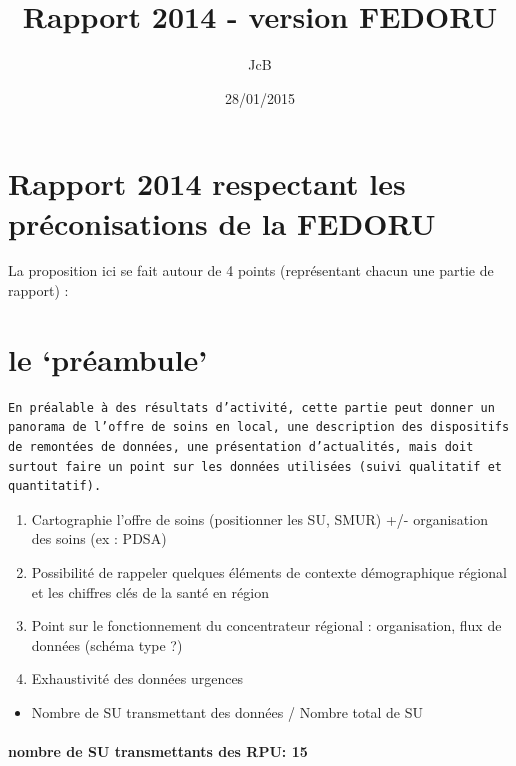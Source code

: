 \documentclass[]{article}
\title{Rapport 2014 - version FEDORU}
\author{JcB}
\date{28/01/2015}
\begin{document}
\maketitle


{
\hypersetup{linkcolor=black}
\setcounter{tocdepth}{2}
\tableofcontents
}
\section{Rapport 2014 respectant les préconisations de la
FEDORU}\label{rapport-2014-respectant-les-preconisations-de-la-fedoru}

La proposition ici se fait autour de 4 points (représentant chacun une
partie de rapport) :

\section{le `préambule'}\label{le-preambule}

\begin{verbatim}
En préalable à des résultats d’activité, cette partie peut donner un panorama de l’offre de soins en local, une description des dispositifs de remontées de données, une présentation d’actualités, mais doit surtout faire un point sur les données utilisées (suivi qualitatif et quantitatif).
\end{verbatim}

\begin{enumerate}
\def\labelenumi{\alph{enumi}.}
\item
  Cartographie l'offre de soins (positionner les SU, SMUR) +/-
  organisation des soins (ex : PDSA)
\item
  Possibilité de rappeler quelques éléments de contexte démographique
  régional et les chiffres clés de la santé en région
\item
  Point sur le fonctionnement du concentrateur régional : organisation,
  flux de données (schéma type ?)
\item
  Exhaustivité des données urgences
\end{enumerate}

\begin{itemize}
\itemsep1pt\parskip0pt
\item
  Nombre de SU transmettant des données / Nombre total de SU
\end{itemize}

\paragraph{nombre de SU transmettants des RPU:
15}\label{nombre-de-su-transmettants-des-rpu-15}
\end{document}
